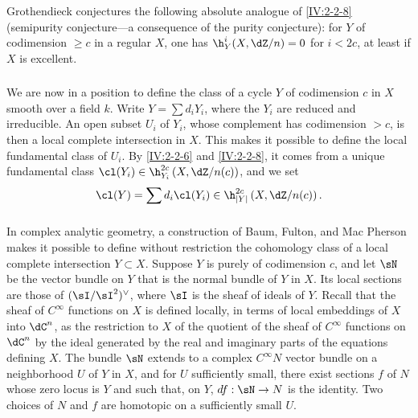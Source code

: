 \subsubsection{}\label{IV:2-2-9}

Grothendieck conjectures the following absolute analogue of
\ref{IV:2-2-8} (semipurity conjecture---a consequence of the purity
conjecture): for $Y$ of codimension $\geqslant c$ in a regular $X$, one has
$\h_Y^i(X,\dZ/n)=0$ for $i<2 c$, at least if $X$ is excellent.






\subsubsection{}\label{IV:2-2-10}

We are now in a position to define the class of a cycle $Y$ of codimension
$c$ in $X$ smooth over a field $k$. Write $Y=\sum d_i Y_i$, where the $Y_i$
are reduced and irreducible. An open subset $U_i$ of $Y_i$, whose complement
has codimension $>c$, is then a local complete intersection in $X$. This
makes it possible to define the local fundamental class of $U_i$. By
\ref{IV:2-2-6} and \ref{IV:2-2-8}, it comes from a unique fundamental class
$\cl(Y_i)\in \h_{Y_i}^{2 c}\left(X,\dZ/n(c)\right)$, and we set
\[
  \cl(Y) = \sum d_i \cl(Y_i) \in \h_{|Y|}^{2 c}\left(X,\dZ/n(c)\right) \text{.}
\]






\subsubsection{}\label{IV:2-2-11}

In complex analytic geometry, a construction of Baum, Fulton, and
Mac Pherson  makes it possible to define without restriction the
cohomology class of a local complete intersection $Y\subset X$. Suppose $Y$
is purely of codimension $c$, and let $\sN$ be the vector bundle on $Y$ that
is the normal bundle of $Y$ in $X$. Its local sections are those of
$(\sI/\sI^2)^\vee$, where $\sI$ is the sheaf of ideals of $Y$. Recall that
the sheaf of $C^\infty$ functions on $X$ is defined locally, in terms of local
embeddings of $X$ into $\dC^n$, as the restriction to $X$ of the quotient of
the sheaf of $C^\infty$ functions on $\dC^n$ by the ideal generated by the
real and imaginary parts of the equations defining $X$. The bundle $\sN$
extends to a complex $C^\infty N$ vector bundle on a neighborhood $U$ of
$Y$ in $X$, and for $U$ sufficiently small, there exist sections $f$ of $N$
whose zero locus is $Y$ and such that, on $Y$, $d f:\sN\to N$ is the
identity. Two choices of $N$ and $f$ are homotopic on a sufficiently small $U$.

